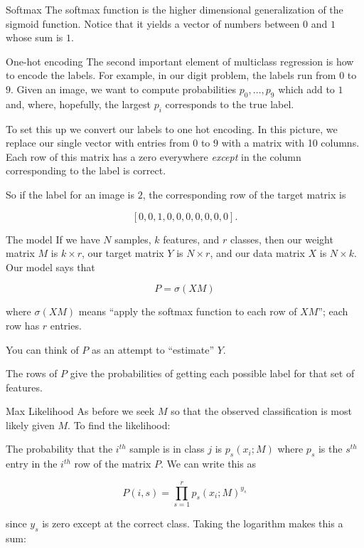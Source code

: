 \documentclass[
  ignorenonframetext,
]{beamer}
\begin{document}
\begin{frame}{Softmax}
\protect\hypertarget{softmax-1}{}
The softmax function is the higher dimensional generalization of the
sigmoid function. Notice that it yields a vector of numbers between
\(0\) and \(1\) whose sum is \(1\).
\end{frame}

\begin{frame}{One-hot encoding}
\protect\hypertarget{one-hot-encoding}{}
The second important element of multiclass regression is how to encode
the labels. For example, in our digit problem, the labels run from \(0\)
to \(9\). Given an image, we want to compute probabilities
\(p_0,\ldots, p_9\) which add to \(1\) and, where, hopefully, the
largest \(p_i\) corresponds to the true label.

To set this up we convert our labels to one hot encoding. In this
picture, we replace our single vector with entries from \(0\) to \(9\)
with a matrix with 10 columns. Each row of this matrix has a zero
everywhere \emph{except} in the column corresponding to the label is
correct.

So if the label for an image is \(2\), the corresponding row of the
target matrix is

\[
[0,0,1,0,0,0,0,0,0,0].
\]
\end{frame}

\begin{frame}{The model}
\protect\hypertarget{the-model}{}
If we have \(N\) samples, \(k\) features, and \(r\) classes, then our
weight matrix \(M\) is \(k\times r\), our target matrix \(Y\) is
\(N\times r\), and our data matrix \(X\) is \(N\times k\). Our model
says that

\[
P = \sigma(XM)
\]

where \(\sigma(XM)\) means ``apply the softmax function to each row of
\(XM\)''; each row has \(r\) entries.

You can think of \(P\) as an attempt to ``estimate'' \(Y\).

The rows of \(P\) give the probabilities of getting each possible label
for that set of features.
\end{frame}

\begin{frame}{Max Likelihood}
\protect\hypertarget{max-likelihood}{}
As before we seek \(M\) so that the observed classification is most
likely given \(M\). To find the likelihood:

The probability that the \(i^{th}\) sample is in class \(j\) is
\(p_{s}(x_i; M)\) where \(p_{s}\) is the \(s^{th}\) entry in the
\(i^{th}\) row of the matrix \(P\). We can write this as

\[
P(i,s) = \prod_{s=1}^{r} p_{s}(x_i; M)^{y_{s}}
\]

since \(y_{s}\) is zero except at the correct class. Taking the
logarithm makes this a sum:
\end{frame}
\end{document}
